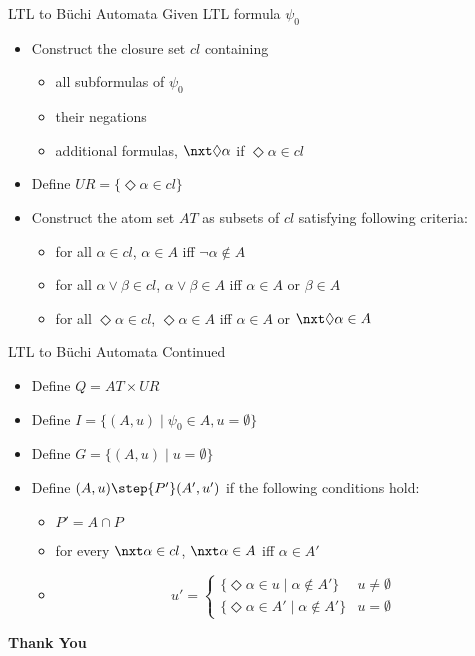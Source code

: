 \documentclass[xcolor=dvipsnames]{beamer}
\begin{document}
\begin{frame}{LTL to B\"uchi Automata}
Given LTL formula $\psi_0$
\begin{itemize}
\item Construct the closure set $cl$ containing
\begin{itemize}
\item all subformulas of $\psi_0$
\item their negations
\item additional formulas, $\nxt \Diamond \alpha$ if $\Diamond \alpha \in cl$
\end{itemize}
\item Define $UR=\{\Diamond \alpha \in cl\}$
\item Construct the atom set $AT$ as subsets of $cl$ satisfying following criteria:
\begin{itemize}
\item for all $\alpha \in cl$, $\alpha \in A$ iff $\lnot \alpha \not \in A$
\item for all $\alpha \lor \beta \in cl$, $\alpha \lor \beta\in A$ iff $\alpha \in A$ or $\beta \in A$
\item for all $\Diamond \alpha \in cl$, $\Diamond \alpha \in A$ iff $\alpha \in A$ or $\nxt \Diamond \alpha \in A$
\end{itemize}

\end{itemize}

\end{frame}

\begin{frame}{LTL to B\"uchi Automata Continued}
\begin{itemize}
\item Define $Q=AT \times UR$
\item Define $I= \{(A,u) \mid \psi_0 \in A,u=\emptyset\}$
\item Define $G= \{(A,u) \mid u=\emptyset\}$
\item Define $(A,u)\step{P'}(A',u')$ if the following conditions hold:
\begin{itemize}
\item $P'=A \cap P$
\item for every $\nxt \alpha \in cl$, $\nxt \alpha \in A$ iff $\alpha \in A'$
\item \[ u'=\left\{ \begin{array}{ll}
                 \{\Diamond \alpha \in u \mid \alpha \not \in A'\}	& u \not = \emptyset\\
                 \{\Diamond \alpha \in A' \mid \alpha \not \in A'\}	& u  = \emptyset
                   
                \end{array}
                	\right. \]

\end{itemize}
\end{itemize}
\end{frame}


\begin{frame}
\begin{center}
{\bf Thank You}
\end{center}
\end{frame}
%
%
\end{document}
